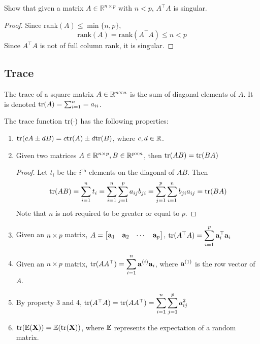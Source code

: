 \begin{Ex}
    Show that given a matrix $A\in\mathbb{R}^{n\times p}$ with $n < p$, $A^{\top}A$ is singular.
    \begin{proof}
        Since $\text{rank}(A) \leq \min\{n, p \}$,
        \begin{equation*}
            \text{rank}(A) = \text{rank}(A^{\top} A) \leq n < p
        \end{equation*}
        Since $A^\top A$ is not of full column rank, it is singular.
    \end{proof}
\end{Ex}

\subsection{Trace}
\begin{Def}
    The trace of a square matrix $A\in \mathbb{R}^{n \times n}$ is the sum of diagonal elements of $A$. It is denoted $\text{tr}(A) = \sum_{i = 1}^n = a_{ii}$.
\end{Def}

\begin{Thm}\label{trace}
    The trace function $\text{tr}(\cdot)$ has the following properties:
    \begin{enumerate}
        \item $\text{tr}(cA \pm dB) = c\text{tr}(A) \pm d\text{tr}(B)$, where $c, d\in \mathbb{R}$.
        \item Given two matrices $A\in\mathbb{R}^{n\times p}, B\in \mathbb{R}^{p\times n}$, then $\text{tr}(AB) = \text{tr}(BA)$
        \begin{proof}
            Let $t_i$ be the $i^{\text{th}}$ elements on the diagonal of $AB$. Then
            \begin{equation*}
                \text{tr}(AB) = \sum_{i = 1}^n t_i = \sum_{i = 1}^n\sum_{j = 1}^p a_{ij}b_{ji} = \sum_{j = 1}^p \sum_{i = 1}^n b_{ji}a_{ij} = \text{tr}(BA)
            \end{equation*}
            Note that $n$ is not required to be greater or equal to $p$.
        \end{proof}

    \item Given an $n\times p$ matrix, $A = \begin{bmatrix}
        \mathbf{a}_1 & \mathbf{a}_2 & \cdots & \mathbf{a}_p
    \end{bmatrix}$, $\text{tr}(A^{\top}A) = \displaystyle \sum_{i = 1}^p \mathbf{a}^{\top}_i \mathbf{a}_i$
    \item Given an $n \times p$ matrix, $\text{tr}(AA^{\top}) = \displaystyle \sum_{i = 1}^ n \mathbf{a}^{(i)} \mathbf{a}_i$, where $\mathbf{a}^{(1)}$ is the row vector of $A$.
    \item By property 3 and 4, $\text{tr}(A^{\top}A) = \text{tr}(AA^{\top}) = \displaystyle \sum_{i = 1}^n\sum_{j = 1}^p a_{ij}^2$
    \item $\text{tr}(\mathbb{E}(\mathbf{X})) = \mathbb{E}(\text{tr}(\mathbf{X}))$, where $\mathbb{E}$ represents the expectation of a random matrix.
    \end{enumerate}
\end{Thm}